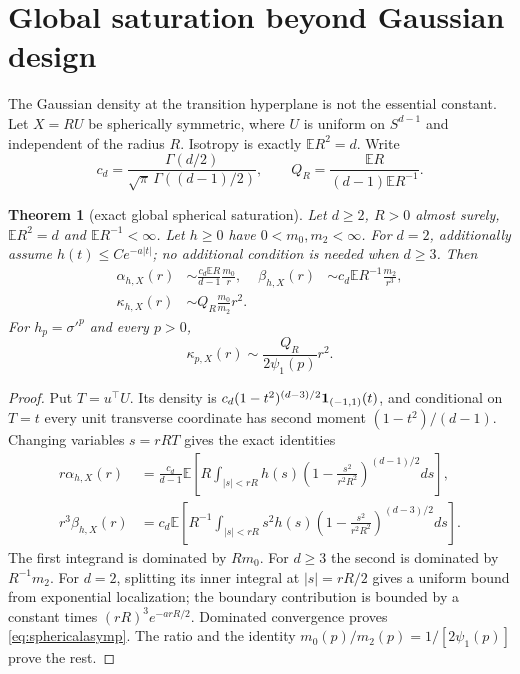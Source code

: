 \documentclass[11pt]{article}
\newtheorem{theorem}{Theorem}[section]
\newcommand{\E}{\mathbb E}
\begin{document}
\section{Global saturation beyond Gaussian design}
\label{sec:global-spherical}

The Gaussian density at the transition hyperplane is not the essential constant.  Let $X=RU$ be spherically
symmetric, where $U$ is uniform on $S^{d-1}$ and independent of the radius $R$.  Isotropy is exactly
$\E R^2=d$.  Write
\[
 c_d=\frac{\Gamma(d/2)}{\sqrt\pi\,\Gamma((d-1)/2)},\qquad
 Q_R=\frac{\E R}{(d-1)\E R^{-1}}.
\]

\begin{theorem}[exact global spherical saturation]
\label{thm:globalspherical}
Let $d\ge2$, $R>0$ almost surely, $\E R^2=d$ and $\E R^{-1}<\infty$.  Let $h\ge0$ have
$0<m_0,m_2<\infty$.  For $d=2$, additionally assume $h(t)\le Ce^{-a|t|}$; no additional condition is needed
when $d\ge3$.  Then
\begin{align}
 \alpha_{h,X}(r)&\sim \frac{c_d\E R}{d-1}\frac{m_0}{r},&
 \beta_{h,X}(r)&\sim c_d\E R^{-1}\frac{m_2}{r^3},\label{eq:sphericalasymp}\\
 \kappa_{h,X}(r)&\sim Q_R\frac{m_0}{m_2}r^2.\label{eq:sphericalkappa}
\end{align}
For $h_p=\sigma'^p$ and every $p>0$,
\begin{equation}
 \kappa_{p,X}(r)\sim\frac{Q_R}{2\psi_1(p)}r^2.
 \label{eq:sphericallogistic}
\end{equation}
\end{theorem}

\begin{proof}
Put $T=u^\top U$.  Its density is
$c_d(1-t^2)^{(d-3)/2}{\bf1}_{(-1,1)}(t)$, and conditional on $T=t$ every unit transverse coordinate has second
moment $(1-t^2)/(d-1)$.  Changing variables $s=rRT$ gives the exact identities
\begin{align}
 r\alpha_{h,X}(r)
 &=\frac{c_d}{d-1}\E\!\left[R\!\int_{|s|<rR}\!h(s)
 \left(1-\frac{s^2}{r^2R^2}\right)^{(d-1)/2}ds\right],\label{eq:sphericalexacta}\\
 r^3\beta_{h,X}(r)
 &=c_d\E\!\left[R^{-1}\!\int_{|s|<rR}\!s^2h(s)
 \left(1-\frac{s^2}{r^2R^2}\right)^{(d-3)/2}ds\right].\label{eq:sphericalexactb}
\end{align}
The first integrand is dominated by $Rm_0$.  For $d\ge3$ the second is dominated by $R^{-1}m_2$.
For $d=2$, splitting its inner integral at $|s|=rR/2$ gives a uniform bound from exponential localization;
the boundary contribution is bounded by a constant times $(rR)^3e^{-arR/2}$.  Dominated convergence proves
\eqref{eq:sphericalasymp}.  The ratio and the identity $m_0(p)/m_2(p)=1/[2\psi_1(p)]$ prove the rest.
\end{proof}
\end{document}

